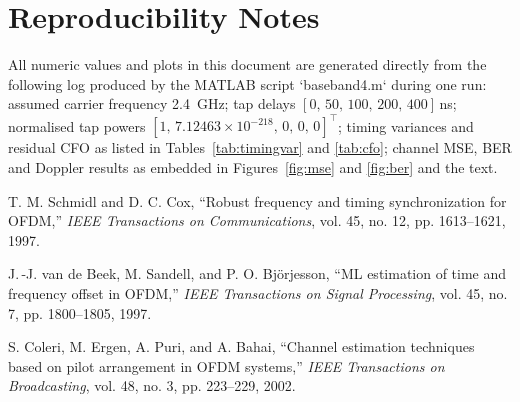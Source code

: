 \documentclass[journal,onecolumn]{IEEEtran}
\begin{document}
\section*{Reproducibility Notes}
All numeric values and plots in this document are generated directly from the following log produced by the MATLAB script `baseband4.m` during one run: assumed carrier frequency \SI{2.4}{GHz}; tap delays $[0,\,50,\,100,\,200,\,400]$\,ns; normalised tap powers $[1,\,7.12463\times10^{-218},\,0,\,0,\,0]^\top$; timing variances and residual CFO as listed in Tables~\ref{tab:timingvar} and \ref{tab:cfo}; channel MSE, BER and Doppler results as embedded in Figures~\ref{fig:mse} and \ref{fig:ber} and the text.

\begin{thebibliography}{3}
T. M. Schmidl and D. C. Cox, ``Robust frequency and timing synchronization for OFDM,'' \emph{IEEE Transactions on Communications}, vol. 45, no. 12, pp. 1613--1621, 1997.

J.\,-J. van de Beek, M. Sandell, and P. O. Bj\"orjesson, ``ML estimation of time and frequency offset in OFDM,'' \emph{IEEE Transactions on Signal Processing}, vol. 45, no. 7, pp. 1800--1805, 1997.

S. Coleri, M. Ergen, A. Puri, and A. Bahai, ``Channel estimation techniques based on pilot arrangement in OFDM systems,'' \emph{IEEE Transactions on Broadcasting}, vol. 48, no. 3, pp. 223--229, 2002.
\end{thebibliography}
\end{document}
